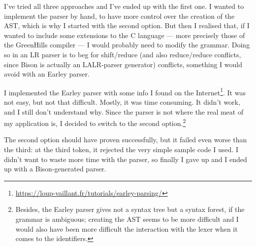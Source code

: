 \documentclass[a4paper,openany]{article}
\begin{document}
I've tried all three approaches and I've ended up with the first one. I wanted to implement the parser by hand, to have more control over the creation of the AST, which is why I started with the second option. But then I realised that, if I wanted to include some extensions to the C language --- more precisely those of the GreenHills compiler --- I would probably need to modify the grammar. Doing so in an LR parser is to beg for shift/reduce (and also reduce/reduce conflicts, since Bison is actually an LALR-parser generator) conflicts, something I would avoid with an Earley parser.

I implemented the Earley parser with some info I found on the Internet\footnote{\url{https://loup-vaillant.fr/tutorials/earley-parsing/}}. It was not easy, but not that difficult. Mostly, it was time consuming. It didn't work, and I still don't understand why. Since the parser is not where the real meat of my application is, I decided to switch to the second option.\footnote{Besides, the Earley parser gives not a syntax tree but a syntax forest, if the grammar is ambiguous; creating the AST seems to be more difficult and I would also have been more difficult the interaction with the lexer when it comes to the identifiers.}

The second option should have proven successfully, but it failed even worse than the third: at the third token, it rejected the very simple sample code I used. I didn't want to waste more time with the parser, so finally I gave up and I ended up with a Bison-generated parser.
\end{document}
